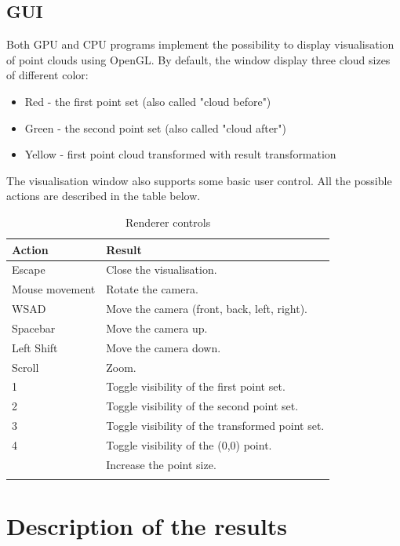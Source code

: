 \documentclass[titlepage]{article}
\begin{document}
\subsection{GUI}
Both GPU and CPU programs implement the possibility to display visualisation of point clouds using OpenGL. By default, the window display three cloud sizes of different color:
\begin{itemize}
\item Red - the first point set (also called "cloud before")
\item Green - the second point set (also called "cloud after")
\item Yellow - first point cloud transformed with result transformation
\end{itemize}

The visualisation window also supports some basic user control. All the possible actions are described in the table below.
\begin{center}
\def\arraystretch{1.5}
\begin{longtable}{ | m{13em} | m{27em}| } 
 \hline
 Action & Result \\
 \hline
 \hline
 Escape & Close the visualisation. \\
 \hline
 Mouse movement & Rotate the camera. \\
 \hline
 WSAD & Move the camera (front, back, left, right). \\
 \hline
 Spacebar & Move the camera up. \\
 \hline
 Left Shift & Move the camera down. \\
 \hline
 Scroll & Zoom. \\
 \hline
 1 & Toggle visibility of the first point set. \\
 \hline
 2 & Toggle visibility of the second point set. \\
 \hline
 3 & Toggle visibility of the transformed point set. \\
 \hline
 4 & Toggle visibility of the (0,0) point. \\
 \hline
 [ & Reduce the point size. \\
 \hline
 ] & Increase the point size. \\
 \hline
 \caption{Renderer controls}
\end{longtable}
\label{tab:controls}
\end{center}

\section{Description of the results}
\end{document}
